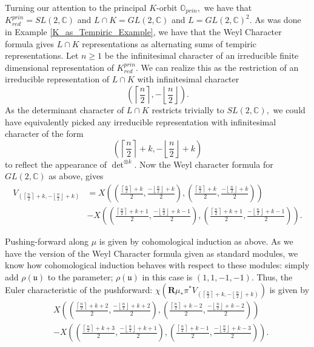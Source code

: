 \documentclass[letterpaper,twosided,11pt]{article}
\theoremstyle{plain}
\theoremstyle{definition}
\theoremstyle{remark}
\newcommand{\C}{\mathbb{C}}
\newcommand{\OO}{\mathbb{O}}
\newcommand{\tensor}{\otimes}
\newcommand{\lie}[1]{\mathfrak{#1}}
\begin{document}
Turning our attention to the principal $K$-orbit $ \OO_{prin}, $ we have
that $ K^{prin}_{red}=SL(2,\C) $ and $ L\cap K=GL(2,\C) $ and $ L=GL(2,\C)^2.
$ As was done in Example \ref{K_as_Tempiric_Example}, we have that the
Weyl Character formula gives $ L\cap K $ representations as alternating
sums of tempiric representations.  Let $ n\geq 1 $ be the infinitesimal
character of an irreducible finite dimensional representation of $ K^{prin}_
{red}. $ We can realize this as the restriction of an irreducible
representation of $ L\cap K $ with infinitesimal character
\[
    \left(\left\lceil \frac{n}{2} \right \rceil,-\left\lfloor \frac{n}{2}
    \right \rfloor \right).
\]
As the determinant character of $ L\cap K $ restricts trivially to $ SL(2,\C),
$ we could have equivalently picked any irreducible representation with
infinitesimal character of the form
\[
    \left(\left\lceil \frac{n}{2} \right \rceil +k,-\left\lfloor \frac{n}
    {2} \right \rfloor +k \right)
\]
to reflect the appearance of $ \det^{\tensor k}. $ Now the Weyl
character formula for $GL(2,\C)$ as above, gives
\begin{align*}
    V_{\left(\left\lceil \frac{n}{2} \right \rceil +k,-\left\lfloor
    \frac{n}{2} \right \rfloor +k \right)}&= X\left(\left(\frac{\left\lceil
    \frac{n}{2} \right \rceil +k}{2},\frac{-\left\lfloor \frac{n}{2}
    \right \rfloor +k}{2}\right),\left(\frac{\left\lceil \frac{n}{2}
    \right \rceil +k}{2},\frac{-\left\lfloor \frac{n}{2} \right \rfloor
    +k}{2}\right)\right)\\
    &-X\left(\left(\frac{\left\lceil \frac{n}{2} \right \rceil +k+1}{2},\frac
    {-\left\lfloor \frac{n}{2} \right \rfloor +k-1}{2}\right),\left(\frac
    {\left\lceil \frac{n}{2} \right \rceil +k+1}{2},\frac{-\left\lfloor
    \frac{n}{2} \right \rfloor +k-1}{2}\right)\right ).
\end{align*}

Pushing-forward along $ \mu $ is given by cohomological induction as
above.  As we have the version of the Weyl Character formula given as
standard modules, we know how cohomological induction behaves with
respect to these modules:  simply add $ \rho(\lie{u}) $ to the
parameter;  $ \rho(\lie{u}) $ in this case is $ (1,1,-1,-1). $ Thus, the
Euler characteristic of the pushforward:  $ \chi(\textbf{R}\mu_*\pi^*V_{\left
(\left\lceil \frac{n}{2} \right \rceil +k,-\left\lfloor \frac{n}{2}
\right \rfloor +k \right)}) $ is given by
\begin{align*}
    &X\left(\left(\frac{\left\lceil \frac{n}{2} \right \rceil +k+2}{2},\frac
    {-\left\lfloor \frac{n}{2} \right \rfloor +k+2}{2}\right),\left(\frac
    {\left\lceil \frac{n}{2} \right \rceil +k-2}{2},\frac{-\left\lfloor
    \frac{n}{2} \right \rfloor +k-2}{2}\right)\right) \\
    &-X\left(\left(\frac{\left\lceil \frac{n}{2} \right \rceil +k+3}{2},\frac
    {-\left\lfloor \frac{n}{2} \right \rfloor +k+1}{2}\right),\left(\frac
    {\left\lceil \frac{n}{2} \right \rceil +k-1}{2},\frac{-\left\lfloor
    \frac{n}{2} \right \rfloor +k-3}{2}\right)\right ).
\end{align*}
\end{document}
